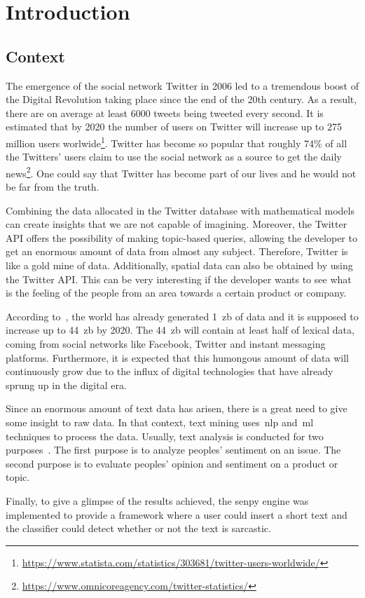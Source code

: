 \chapter{Introduction}



\section{Context}
The emergence of the social network Twitter in 2006 led to a tremendous boost of the Digital Revolution taking place since the end of the 20th century. As a result, there are on average at least 6000 tweets being tweeted every second. It is estimated that by 2020 the number of users on Twitter will increase up to 275 million users worlwide\footnote{\url{https://www.statista.com/statistics/303681/twitter-users-worldwide/}}. Twitter has become so popular that roughly 74\% of all the Twitters' users claim to use the social network as a source to get the daily news\footnote{\url{https://www.omnicoreagency.com/twitter-statistics/}}. One could say that Twitter has become part of our lives and he would not be far from the truth.\par

 Combining the data allocated in the Twitter database with mathematical models can create insights that we are not capable of imagining. Moreover, the Twitter API offers the possibility of making topic-based queries, allowing the developer to get an enormous amount of data from almost any subject. Therefore, Twitter is like a gold mine of data. Additionally, spatial data can also be obtained by using the Twitter API. This can be very interesting if the developer wants to see what is the feeling of the people from an area towards a certain product or company. \par
According to~\cite{shayaa2018sentiment}, the world has already generated 1~\ac{zb} of data and it is supposed to increase up to 44~\ac{zb} by 2020. The 44~\ac{zb} will contain at least half of lexical data, coming from social networks like Facebook, Twitter and instant messaging platforms. Furthermore, it is expected that this humongous amount of data will continuously grow due to the influx of digital technologies that have already sprung up in the digital era.\par
Since an enormous amount of text data has arisen, there is a great need to give some insight to raw data. In that context, text mining uses~\ac{nlp} and~\ac{ml} techniques to process the data. Usually, text analysis is conducted for two purposes~\cite{shayaa2018sentiment}. The first purpose is to analyze peoples' sentiment on an issue. The second purpose is to evaluate peoples' opinion and sentiment on a product or topic.\par
Finally, to give a glimpse of the results achieved, the senpy engine was implemented to provide a framework where a user could insert a short text and the classifier could detect whether or not the text is sarcastic.
